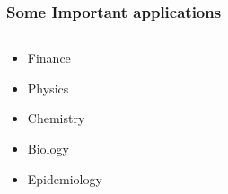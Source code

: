  \begin{frame}
    \frametitle{Some Important applications}
    \begin{columns}
         \begin{overlayarea}{\textwidth}{.3\textheight}
             \begin{itemize}%
                 \item
                     Finance
                 \item
                     Physics
                 \item
                     Chemistry
                 \item
                     Biology
                 \item
                     Epidemiology
             \end{itemize}
        \end{overlayarea}
        \begin{overlayarea}{\textwidth}{.5\textheight}
            \begin{exampleblock}{

}
\end{exampleblock}
\end{overlayarea}
\end{columns}
\end{frame}
